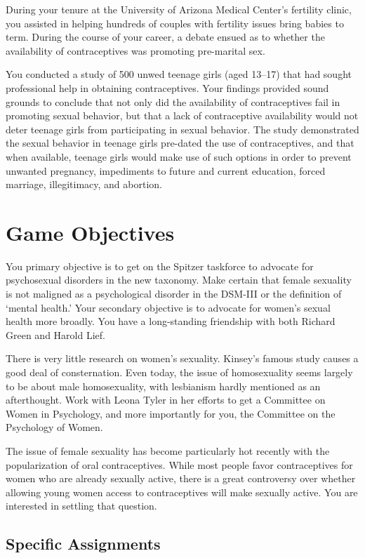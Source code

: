 \begin{refsection}
During your tenure at the University of Arizona Medical Center’s fertility clinic, you assisted in helping hundreds of couples with fertility issues bring babies to term. During the course of your career, a debate ensued as to whether the availability of contraceptives was promoting pre-marital sex.

You conducted a study of 500 unwed teenage girls (aged 13--17) that had sought professional help in obtaining contraceptives. Your findings provided sound grounds to conclude that not only did the availability of contraceptives fail in promoting sexual behavior, but that a lack of contraceptive availability would not deter teenage girls from participating in sexual behavior. The study demonstrated the sexual behavior in teenage girls pre-dated the use of contraceptives, and that when available, teenage girls would make use of such options in order to prevent unwanted pregnancy, impediments to future and current education, forced marriage, illegitimacy, and abortion.

\section{Game Objectives}
\label{gameobjectives}

You primary objective is to get on the Spitzer taskforce to advocate for psychosexual disorders in the new taxonomy. Make certain that female sexuality is not maligned as a psychological disorder in the DSM-III or the definition of `mental health.' Your secondary objective is to advocate for women's sexual health more broadly. You have a long-standing friendship with both Richard Green and Harold Lief.

There is very little research on women's sexuality. Kinsey's famous study causes a good deal of consternation. Even today, the issue of homosexuality seems largely to be about male homosexuality, with lesbianism hardly mentioned as an afterthought. Work with Leona Tyler in her efforts to get a Committee on Women in Psychology, and more importantly for you, the Committee on the Psychology of Women.

The issue of female sexuality has become particularly hot recently with the popularization of oral contraceptives. While most people favor contraceptives for women who are already sexually active, there is a great controversy over whether allowing young women access to contraceptives will make sexually active. You are interested in settling that question.

\subsection{Specific Assignments}
\label{specificassignments}


\end{refsection}
